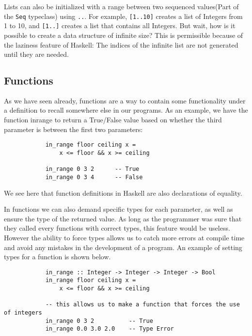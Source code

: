 \documentclass{article}
\begin{document}
        \medskip\noindent
        Lists can also be initialized with a range between two sequenced values(Part of the \lstinline{Seq} typeclass) using \lstinline{..}. For example, \lstinline{[1..10]} creates a list of Integers from 1 to 10, and \lstinline{[1..]} creates a list that contains all Integers. But wait, how is it possible to create a data structure of infinite size? This is permissible because of the laziness feature of Haskell: The indices of the infinite list are not generated until they are needed.
    
    \subsection{Functions}
        As we have seen already, functions are a way to contain some functionality under a definition to recall somewhere else in our programs. As an example, we have the function in\textunderscore range to return a True/False value based on whether the third parameter is between the first two parameters:
        \begin{lstlisting}
            in_range floor ceiling x =
                x <= floor && x >= ceiling
            
            in_range 0 3 2      -- True
            in_range 0 3 4      -- False
        \end{lstlisting}

        \medskip\noindent
        We see here that function definitions in Haskell are also declarations of equality.
        
        \medskip\noindent
        In functions we can also demand specific types for each parameter, as well as ensure the type of the returned value. As long as the programmer was sure that they called every functions with correct types, this feature would be useless. However the ability to force types allows us to catch more errors at compile time and avoid any mistakes in the development of a program. An example of setting types for a function is shown below.
        \begin{lstlisting}
            in_range :: Integer -> Integer -> Integer -> Bool
            in_range floor ceiling x = 
                x <= floor && x >= ceiling
                
            -- this allows us to make a function that forces the use of integers
            in_range 0 3 2          -- True
            in_range 0.0 3.0 2.0    -- Type Error
        \end{lstlisting}
        
\end{document}
